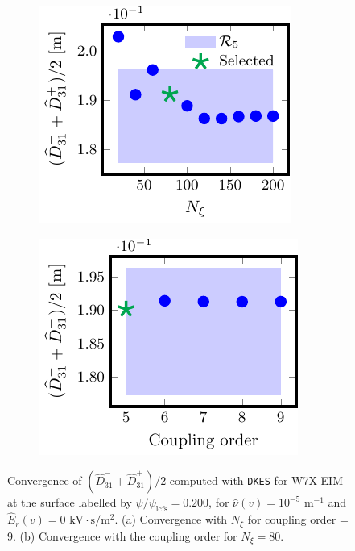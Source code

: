 \documentclass[10pt]{iopart}
\newcommand{\DKES}{{\texttt{DKES}}}
\begin{document}
\begin{figure}[t]
	\centering	
	\begin{subfigure}[t]{0.32\textwidth}
		\includegraphics{DKES-Convergence-Legendre-W7X-EIM-s0200-Er-0-D31-Detail}
%		
		\caption{}
		\label{subfig:DKES_D31_convergence_Legendre_W7X_EIM_0200_Erho_0_Detail}
	\end{subfigure}
	\begin{subfigure}[t]{0.32\textwidth}
		\includegraphics{DKES-Convergence-theta-zeta-W7X-EIM-s0200-Er-0-D31}
		\caption{}
		\label{subfig:DKES_D31_convergence_Coupling_parameter_W7X_EIM_0200_Erho_0}
	\end{subfigure}
	
	
	\caption{Convergence of $(\widehat{D}_{31}^- + \widehat{D}_{31}^+) /2$ computed with {\DKES} for W7X-EIM at the surface labelled by $\psi/\psi_{\text{lcfs}}=0.200$, for $\hat{\nu}(v)=10^{-5}$ $\text{m}^{-1}$ and $\widehat{E}_r(v)=0$ $\text{kV}\cdot\text{s}/\text{m}^2$. (a) Convergence with $N_\xi$ for coupling order = 9. (b) Convergence with the coupling order for $N_\xi= 80$.}
	\label{fig:DKES_Convergence_W7X_EIM_Er_0}
\end{figure}
\end{document}
